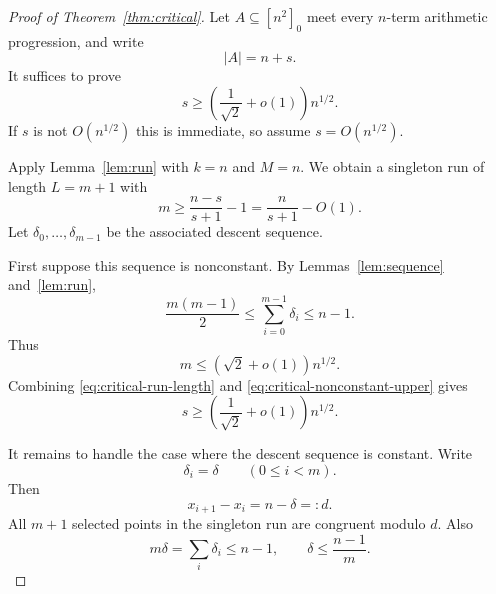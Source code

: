 \documentclass[11pt]{article}
\theoremstyle{remark}
\numberwithin{equation}{section}
\begin{document}
\begin{proof}[Proof of Theorem~\ref{thm:critical}]
Let $A\subseteq[n^2]_0$ meet every $n$-term arithmetic progression, and write
\[
        |A|=n+s.
\]
It suffices to prove
\[
        s\ge \left(\frac1{\sqrt2}+o(1)\right)n^{1/2}.
\]
If $s$ is not $O(n^{1/2})$ this is immediate, so assume $s=O(n^{1/2})$.

Apply Lemma~\ref{lem:run} with $k=n$ and $M=n$.
We obtain a singleton run of length $L=m+1$ with
\begin{equation}\label{eq:critical-run-length}
        m\ge \frac{n-s}{s+1}-1
        =
        \frac{n}{s+1}-O(1).
\end{equation}
Let $\delta_0,\ldots,\delta_{m-1}$ be the associated descent sequence.

First suppose this sequence is nonconstant.
By Lemmas~\ref{lem:sequence} and~\ref{lem:run},
\begin{equation}\label{eq:critical-nonconstant-descent}
        \frac{m(m-1)}2
        \le
        \sum_{i=0}^{m-1}\delta_i
        \le n-1.
\end{equation}
Thus
\begin{equation}\label{eq:critical-nonconstant-upper}
        m\le (\sqrt2+o(1))n^{1/2}.
\end{equation}
Combining \eqref{eq:critical-run-length} and \eqref{eq:critical-nonconstant-upper} gives
\[
        s\ge \left(\frac1{\sqrt2}+o(1)\right)n^{1/2}.
\]

It remains to handle the case where the descent sequence is constant.
Write
\[
        \delta_i=\delta
        \qquad
        (0\le i<m).
\]
Then
\[
        x_{i+1}-x_i=n-\delta=:d.
\]
All $m+1$ selected points in the singleton run are congruent modulo $d$.
Also
\begin{equation}\label{eq:critical-delta-bound}
        m\delta=\sum_i\delta_i\le n-1,
        \qquad
        \delta\le \frac{n-1}{m}.
\end{equation}


\end{proof}
\end{document}
